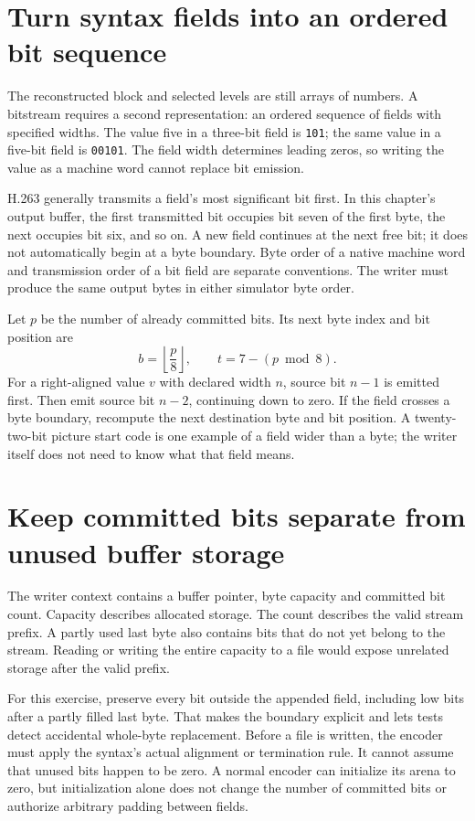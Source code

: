 \section{Turn syntax fields into an ordered bit sequence}
The reconstructed block and selected levels are still arrays of numbers. A
bitstream requires a second representation: an ordered sequence of fields with
specified widths. The value five in a three-bit field is \texttt{101}; the same
value in a five-bit field is \texttt{00101}. The field width determines leading
zeros, so writing the value as a machine word cannot replace bit emission.

H.263 generally transmits a field's most significant bit first. In this chapter's
output buffer, the first transmitted bit occupies bit seven of the first byte,
the next occupies bit six, and so on. A new field continues at the next free bit;
it does not automatically begin at a byte boundary. Byte order of a native
machine word and transmission order of a bit field are separate conventions.
The writer must produce the same output bytes in either simulator byte order.

Let $p$ be the number of already committed bits. Its next byte index and bit
position are
\[
 b=\left\lfloor\frac p8\right\rfloor,\qquad t=7-(p\bmod8).
\]
For a right-aligned value $v$ with declared width $n$, source bit $n-1$ is
emitted first. Then emit source bit $n-2$, continuing down to zero. If the field
crosses a byte boundary, recompute the next destination byte and bit position.
A twenty-two-bit picture start code is one example of a field wider than a byte;
the writer itself does not need to know what that field means.

\section{Keep committed bits separate from unused buffer storage}
The writer context contains a buffer pointer, byte capacity and committed bit
count. Capacity describes allocated storage. The count describes the valid stream
prefix. A partly used last byte also contains bits that do not yet belong to the
stream. Reading or writing the entire capacity to a file would expose unrelated
storage after the valid prefix.

For this exercise, preserve every bit outside the appended field, including low
bits after a partly filled last byte. That makes the boundary explicit and lets
tests detect accidental whole-byte replacement. Before a file is written, the
encoder must apply the syntax's actual alignment or termination rule. It cannot
assume that unused bits happen to be zero. A normal encoder can initialize its
arena to zero, but initialization alone does not change the number of committed
bits or authorize arbitrary padding between fields.

